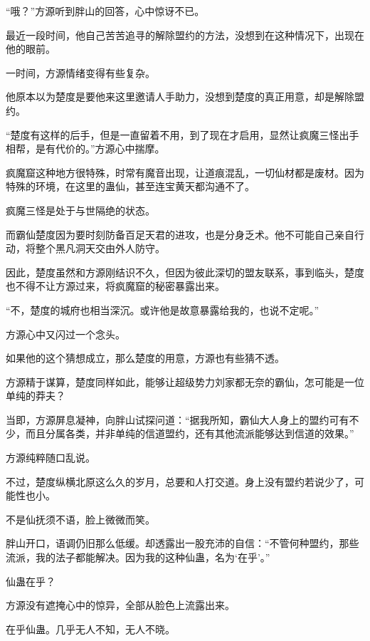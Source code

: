 
\begin{this_body}



“哦？”方源听到胖山的回答，心中惊讶不已。

最近一段时间，他自己苦苦追寻的解除盟约的方法，没想到在这种情况下，出现在他的眼前。

一时间，方源情绪变得有些复杂。

他原本以为楚度是要他来这里邀请人手助力，没想到楚度的真正用意，却是解除盟约。

“楚度有这样的后手，但是一直留着不用，到了现在才启用，显然让疯魔三怪出手相帮，是有代价的。”方源心中揣摩。

疯魔窟这种地方很特殊，时常有魔音出现，让道痕混乱，一切仙材都是废材。因为特殊的环境，在这里的蛊仙，甚至连宝黄天都沟通不了。

疯魔三怪是处于与世隔绝的状态。

而霸仙楚度因为要时刻防备百足天君的进攻，也是分身乏术。他不可能自己亲自行动，将整个黑凡洞天交由外人防守。

因此，楚度虽然和方源刚结识不久，但因为彼此深切的盟友联系，事到临头，楚度也不得不让方源过来，将疯魔窟的秘密暴露出来。

“不，楚度的城府也相当深沉。或许他是故意暴露给我的，也说不定呢。”

方源心中又闪过一个念头。

如果他的这个猜想成立，那么楚度的用意，方源也有些猜不透。

方源精于谋算，楚度同样如此，能够让超级势力刘家都无奈的霸仙，怎可能是一位单纯的莽夫？

当即，方源屏息凝神，向胖山试探问道：“据我所知，霸仙大人身上的盟约可有不少，而且分属各类，并非单纯的信道盟约，还有其他流派能够达到信道的效果。”

方源纯粹随口乱说。

不过，楚度纵横北原这么久的岁月，总要和人打交道。身上没有盟约若说少了，可能性也小。

不是仙抚须不语，脸上微微而笑。

胖山开口，语调仍旧那么低缓。却透露出一股充沛的自信：“不管何种盟约，那些流派，我的法子都能解决。因为我的这种仙蛊，名为‘在乎’。”

仙蛊在乎？

方源没有遮掩心中的惊异，全部从脸色上流露出来。

在乎仙蛊。几乎无人不知，无人不晓。


\end{this_body}
